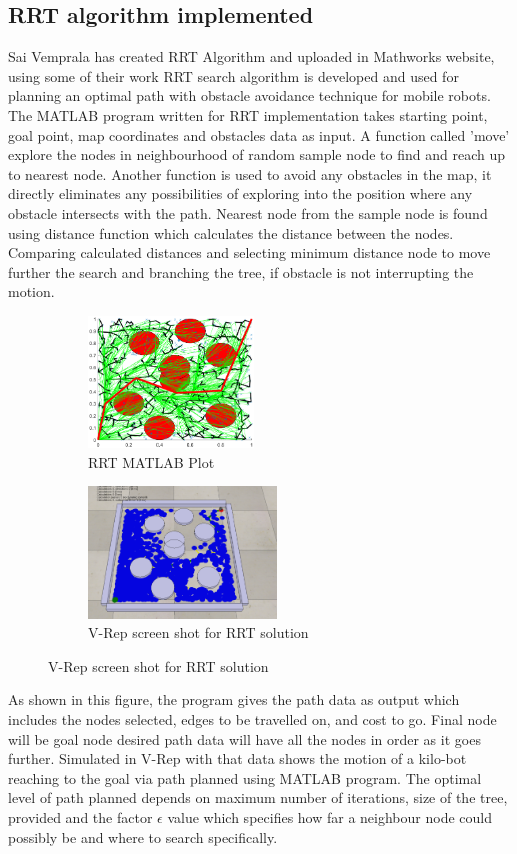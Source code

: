 \documentclass[12pt]{article}
\begin{document}
\subsection{RRT algorithm implemented}
Sai Vemprala has created RRT Algorithm and uploaded in Mathworks website, using some of their work RRT search algorithm is developed and used for planning an optimal path with obstacle avoidance technique for mobile robots. The MATLAB program written for RRT implementation takes starting point, goal point, map coordinates and obstacles data as input. A function called 'move' explore the nodes in neighbourhood of random sample node to find and reach up to nearest node. Another function is used to avoid  any obstacles in the map, it directly eliminates any possibilities of exploring into the position where any obstacle intersects with the path. Nearest node from the sample node is found using distance function which calculates the distance between the nodes. Comparing calculated distances and selecting minimum distance node to move further the search and branching the tree, if obstacle is not interrupting the motion. 

\begin{figure}[H]
\begin{subfigure}{0.5\textwidth}
\includegraphics[width=0.7\linewidth, height=3.5cm]{matlab_plot.eps}
\captionsetup{labelformat=empty}
\caption{RRT MATLAB Plot}
\end{subfigure}
\begin{subfigure}{0.5\textwidth}
\includegraphics[width=0.7\linewidth, height=3.5cm]{screenshot.PNG}
\captionsetup{labelformat=empty}
\caption{V-Rep screen shot for RRT solution}
\end{subfigure}
\end{figure}
As shown in this figure, the program gives the path data as output which includes the nodes selected, edges to be travelled on, and cost to go. Final node will be goal node desired path data will have all the nodes in order as it goes further. Simulated in V-Rep with that data shows the motion of a kilo-bot reaching to the goal via path planned using MATLAB program. The optimal level of path planned depends on maximum number of iterations, size of the tree, provided and the factor $\epsilon$ value which specifies how far a neighbour node could possibly be and where to search specifically.
\end{document}
